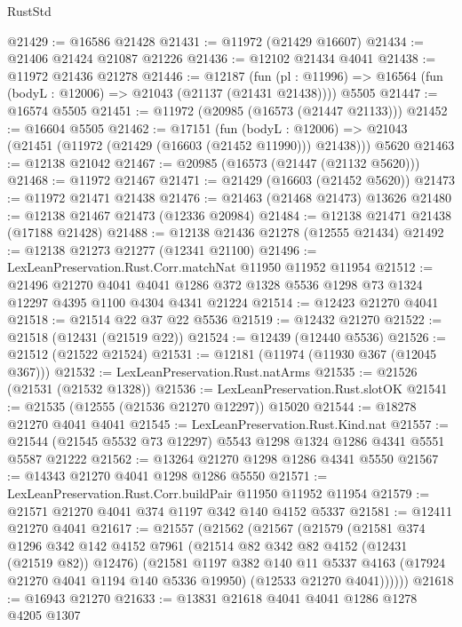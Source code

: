 \begin{lexlean}{RustStd}
\begin{coremodule}
@21429 := @16586 @21428
@21431 := @11972 (@21429 @16607)
@21434 := @21406 @21424 @21087 @21226
@21436 := @12102 @21434 @4041
@21438 := @11972 @21436 @21278
@21446 := @12187
    (fun (pl : @11996) => @16564 (fun (bodyL : @12006) => @21043 (@21137 (@21431 @21438))))
    @5505
@21447 := @16574 @5505
@21451 := @11972 (@20985 (@16573 (@21447 @21133)))
@21452 := @16604 @5505
@21462 := @17151
    (fun (bodyL : @12006) => @21043 (@21451 (@11972 (@21429 (@16603 (@21452 @11990))) @21438)))
    @5620
@21463 := @12138 @21042
@21467 := @20985 (@16573 (@21447 (@21132 @5620)))
@21468 := @11972 @21467
@21471 := @21429 (@16603 (@21452 @5620))
@21473 := @11972 @21471 @21438
@21476 := @21463 (@21468 @21473) @13626
@21480 := @12138 @21467 @21473 (@12336 @20984)
@21484 := @12138 @21471 @21438 (@17188 @21428)
@21488 := @12138 @21436 @21278 (@12555 @21434)
@21492 := @12138 @21273 @21277 (@12341 @21100)
@21496 := LexLeanPreservation.Rust.Corr.matchNat @11950 @11952 @11954
@21512 := @21496
    @21270
    @4041
    @4041
    @1286
    @372
    @1328
    @5536
    @1298
    @73
    @1324
    @12297
    @4395
    @1100
    @4304
    @4341
    @21224
@21514 := @12423 @21270 @4041
@21518 := @21514 @22 @37 @22 @5536
@21519 := @12432 @21270
@21522 := @21518 (@12431 (@21519 @22))
@21524 := @12439 (@12440 @5536)
@21526 := @21512 (@21522 @21524)
@21531 := @12181 (@11974 (@11930 @367 (@12045 @367)))
@21532 := LexLeanPreservation.Rust.natArms
@21535 := @21526 (@21531 (@21532 @1328))
@21536 := LexLeanPreservation.Rust.slotOK
@21541 := @21535 (@12555 (@21536 @21270 @12297)) @15020
@21544 := @18278 @21270 @4041 @4041
@21545 := LexLeanPreservation.Rust.Kind.nat
@21557 := @21544 (@21545 @5532 @73 @12297) @5543 @1298 @1324 @1286 @4341 @5551 @5587 @21222
@21562 := @13264 @21270 @1298 @1286 @4341 @5550
@21567 := @14343 @21270 @4041 @1298 @1286 @5550
@21571 := LexLeanPreservation.Rust.Corr.buildPair @11950 @11952 @11954
@21579 := @21571 @21270 @4041 @374 @1197 @342 @140 @4152 @5337
@21581 := @12411 @21270 @4041
@21617 := @21557
    (@21562
      (@21567
        (@21579
          (@21581
            @374
            @1296
            @342
            @142
            @4152
            @7961
            (@21514 @82 @342 @82 @4152 (@12431 (@21519 @82)) @12476)
            (@21581
              @1197
              @382
              @140
              @11
              @5337
              @4163
              (@17924 @21270 @4041 @1194 @140 @5336 @19950)
              (@12533 @21270 @4041))))))
@21618 := @16943 @21270
@21633 := @13831
    @21618
    @4041
    @4041
    @1286
    @1278
    @4205
    @1307

\end{coremodule}
\end{lexlean}
